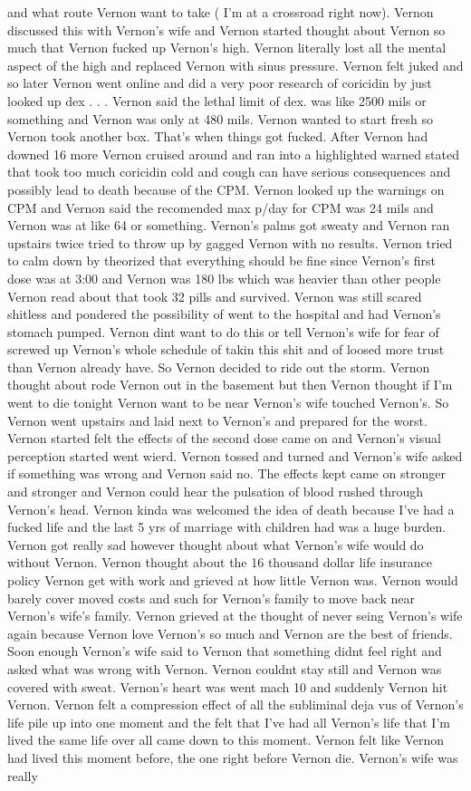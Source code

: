 \documentclass[12pt]{book}
\begin{document}
and what route Vernon want to take ( I'm at a crossroad right now). Vernon discussed this with Vernon's wife and Vernon started thought about Vernon so much that Vernon fucked up Vernon's high. Vernon literally lost all the mental aspect of the high and replaced Vernon with sinus pressure. Vernon felt juked and so later Vernon went online and did a very poor research of coricidin by just looked up dex . . .  Vernon said the lethal limit of dex. was like 2500 mils or something and Vernon was only at 480 mils. Vernon wanted to start fresh so Vernon took another box. That's when things got fucked. After Vernon had downed 16 more Vernon cruised around and ran into a highlighted warned stated that took too much coricidin cold and cough can have serious consequences and possibly lead to death because of the CPM. Vernon looked up the warnings on CPM and Vernon said the recomended max p/day for CPM was 24 mils and Vernon was at like 64 or something. Vernon's palms got sweaty and Vernon ran upstairs twice tried to throw up by gagged Vernon with no results. Vernon tried to calm down by theorized that everything should be fine since Vernon's first dose was at 3:00 and Vernon was 180 lbs which was heavier than other people Vernon read about that took 32 pills and survived. Vernon was still scared shitless and pondered the possibility of went to the hospital and had Vernon's stomach pumped. Vernon dint want to do this or tell Vernon's wife for fear of screwed up Vernon's whole schedule of takin this shit and of loosed more trust than Vernon already have. So Vernon decided to ride out the storm. Vernon thought about rode Vernon out in the basement but then Vernon thought if I'm went to die tonight Vernon want to be near Vernon's wife touched Vernon's. So Vernon went upstairs and laid next to Vernon's and prepared for the worst. Vernon started felt the effects of the second dose came on and Vernon's visual perception started went wierd. Vernon tossed and turned and Vernon's wife asked if something was wrong and Vernon said no. The effects kept came on stronger and stronger and Vernon could hear the pulsation of blood rushed through Vernon's head. Vernon kinda was welcomed the idea of death because I've had a fucked life and the last 5 yrs of marriage with children had was a huge burden. Vernon got really sad however thought about what Vernon's wife would do without Vernon. Vernon thought about the 16 thousand dollar life insurance policy Vernon get with work and grieved at how little Vernon was. Vernon would barely cover moved costs and such for Vernon's family to move back near Vernon's wife's family. Vernon grieved at the thought of never seing Vernon's wife again because Vernon love Vernon's so much and Vernon are the best of friends. Soon enough Vernon's wife said to Vernon that something didnt feel right and asked what was wrong with Vernon. Vernon couldnt stay still and Vernon was covered with sweat. Vernon's heart was went mach 10 and suddenly Vernon hit Vernon. Vernon felt a compression effect of all the subliminal deja vus of Vernon's life pile up into one moment and the felt that I've had all Vernon's life that I'm lived the same life over all came down to this moment. Vernon felt like Vernon had lived this moment before, the one right before Vernon die. Vernon's wife was really 
\end{document}
